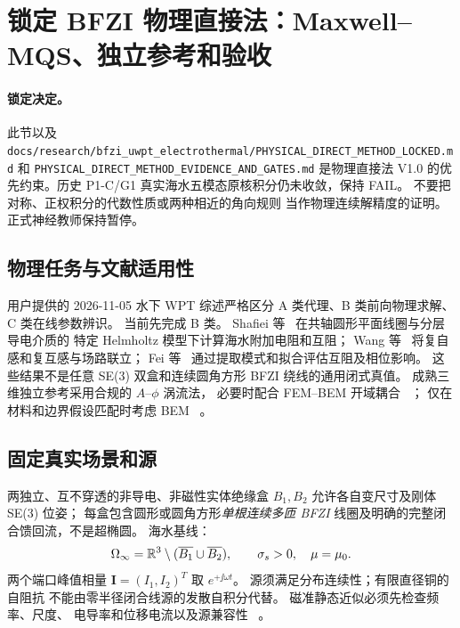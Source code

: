 
\section{锁定 BFZI 物理直接法：Maxwell--MQS、独立参考和验收}
\label{sec:bfzi-physical-direct-locked}

\paragraph{锁定决定。}
此节以及
\texttt{docs/research/bfzi\_uwpt\_electrothermal/PHYSICAL\_DIRECT\_METHOD\_LOCKED.md}
和
\texttt{PHYSICAL\_DIRECT\_METHOD\_EVIDENCE\_AND\_GATES.md}
是物理直接法 V1.0 的优先约束。历史 P1-C/G1
真实海水五模态原核积分仍未收敛，保持 FAIL。
不要把对称、正权积分的代数性质或两种相近的角向规则
当作物理连续解精度的证明。正式神经教师保持暂停。

\subsection{物理任务与文献适用性}
用户提供的 2026-11-05 水下 WPT 综述严格区分
A 类代理、B 类前向物理求解、C 类在线参数辨识。
当前先完成 B 类。
Shafiei 等~\cite{shafiei2025uwpt}
在共轴圆形平面线圈与分层导电介质的
特定 Helmholtz 模型下计算海水附加电阻和互阻；
Wang 等~\cite{wang2025marinewpt}
将复自感和复互感与场路联立；
Fei 等~\cite{fei2025seawater}
通过提取模式和拟合评估互阻及相位影响。
这些结果不是任意 SE(3) 双盒和连续圆角方形
BFZI 绕线的通用闭式真值。
成熟三维独立参考采用合规的 $A$--$\phi$ 涡流法，
必要时配合 FEM--BEM 开域耦合
~\cite{hiptmair2001coupling,hiptmaiostrowski2005}；
仅在材料和边界假设匹配时考虑 BEM
~\cite{tsuboitanaka1990}。

\subsection{固定真实场景和源}
两独立、互不穿透的非导电、非磁性实体绝缘盒
$B_1,B_2$ 允许各自变尺寸及刚体 SE(3) 位姿；
每盒包含圆形或圆角方形\emph{单根连续多匝 BFZI}
线圈及明确的完整闭合馈回流，不是超椭圆。
海水基线：
\[
 \Omega_\infty=\mathbb R^3\setminus
 (\overline{B_1}\cup\overline{B_2}),
 \qquad \sigma_s>0,\quad\mu=\mu_0.
\]
两个端口峰值相量 $\bm I=(I_1,I_2)^T$
取 $e^{+\jj\omega t}$。
源须满足分布连续性；有限直径铜的自阻抗
不能由零半径闭合线源的发散自积分代替。
磁准静态近似必须先检查频率、尺度、
电导率和位移电流以及源兼容性
~\cite{ammaribuffanedelec2000}。

